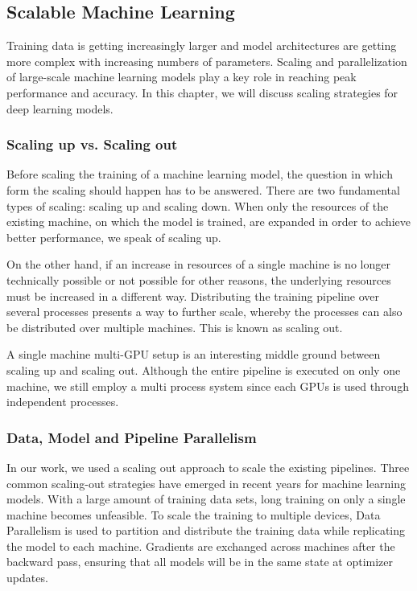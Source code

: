 \subsection{Scalable Machine Learning}

Training data is getting increasingly larger and model architectures are getting more complex with increasing numbers 
of parameters. Scaling and parallelization of large-scale machine learning models play a key role in reaching peak 
performance and accuracy. In this chapter, we will discuss scaling strategies for deep learning models. 

\subsubsection{Scaling up vs. Scaling out}

Before scaling the training of a machine learning model, the question in which form the scaling should happen has to 
be answered. There are two fundamental types of scaling: scaling up and scaling down. When only the resources of the 
existing machine, on which the model is trained, are expanded in order to achieve better performance, we speak of 
scaling up.

On the other hand, if an increase in resources of a single machine is no longer technically possible or not possible for 
other reasons, the underlying resources must be increased in a different way. Distributing the training pipeline over 
several processes presents a way to further scale, whereby the processes can also be distributed over multiple machines. 
This is known as scaling out. 

A single machine multi-GPU setup is an interesting middle ground between scaling up and scaling out. Although the entire 
pipeline is executed on only one machine, we still employ a multi process system since each GPUs is used through 
independent processes.

\subsubsection{Data, Model and Pipeline Parallelism}

In our work, we used a scaling out approach to scale the existing pipelines. Three common scaling-out strategies have emerged 
 in recent years for machine learning models. With a large amount of training data sets, long training on only a single 
 machine becomes unfeasible. To scale the training to multiple devices, Data Parallelism is used to partition and distribute 
 the training data while replicating the model to each machine. Gradients are exchanged across machines after the backward 
 pass, ensuring that all models will be in the same state at optimizer updates. 

